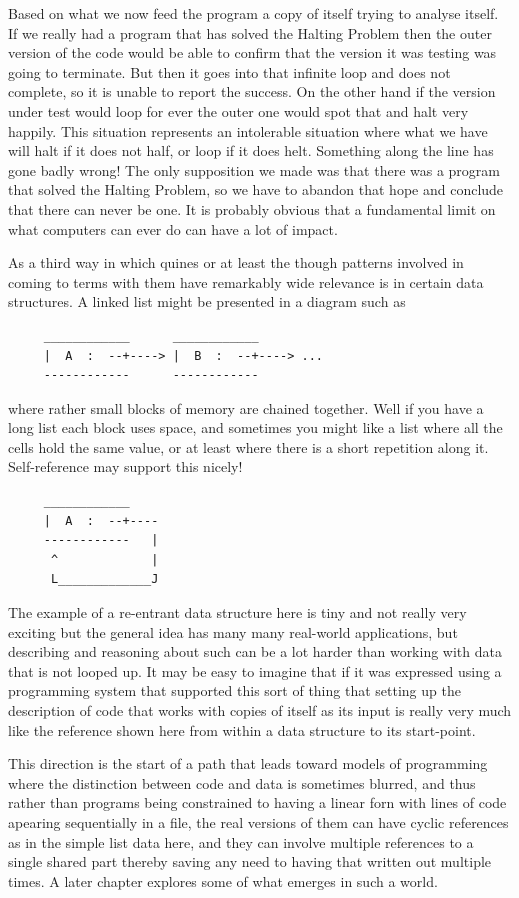 Based on what we now feed the program a copy of itself trying to
analyse itself. If we really had a program that has solved the Halting Problem
then the outer version of the code would be able to confirm that the
version it was testing was going to terminate. But then it goes into
that infinite loop and does not complete, so it is unable to report
the success. On the other hand if the version under test would loop
for ever the outer one would spot that and halt very happily. This situation
represents an intolerable situation where what we have will halt if it
does not half, or loop if it does helt. Something along the line has
gone badly wrong! The only supposition we made was that there was a program
that solved the Halting Problem, so we have to abandon that hope and conclude
that there can never be one. It is probably obvious that a fundamental
limit on what computers can ever do can have a lot of impact.


As a third way in which quines or at least the though patterns involved in
coming to terms with them have remarkably wide relevance is in certain
data structures. A linked list might be presented in a diagram such as
\begin{verbatim}
     ____________      ____________
     |  A  :  --+----> |  B  :  --+----> ...
     ------------      ------------
\end{verbatim}
where rather small blocks of memory are chained together. Well if you have
a long list each block uses space, and sometimes you might like a list where
all the cells hold the same value, or at least where there is a short
repetition along it. Self-reference may support this nicely!
\begin{verbatim}
     ____________
     |  A  :  --+----
     ------------   |
      ^             |
      L_____________J
\end{verbatim}
The example of a re-entrant data structure here is tiny and not really
very exciting but the general idea has many many real-world applications,
but describing and reasoning about such can be a lot harder than
working with data that is not looped up. It may be easy to imagine that
if it was expressed using a programming system that supported this sort
of thing that setting up the description of code that works with copies
of itself as its input is really very much like the reference shown
here from within a data structure to its start-point.

This direction is the start of a path that leads toward models of
programming where the distinction between code and data is sometimes
blurred, and thus rather than programs being constrained to
having a linear forn with lines of code apearing sequentially in
a file, the real versions of them can have cyclic references as in the
simple list data here, and they can involve multiple references to
a single shared part thereby saving any need to having that written out
multiple times. A later chapter explores some of what emerges in
such a world.

